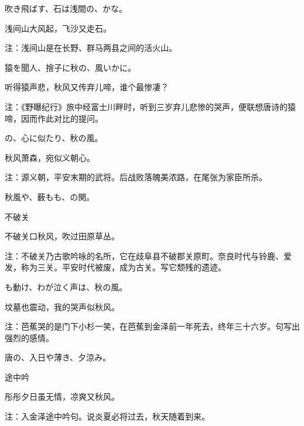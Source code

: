 \begin{haiku}
    {\FH 吹き飛ばす、石は浅間の、かな。}

    {\FK 浅间山大风起，飞沙又走石。}

    {\FT 注：浅间山是在长野、群马两县之间的活火山。}
\end{haiku}

\begin{haiku}
    {\FH 猿を聞人、捨子に秋の、風いかに。}

    {\FK 听得猿声悲，秋风又传弃儿啼，谁个最惨凄？}

    {\FT 注：《野曝纪行》旅中经富士川畔时，听到三岁弃儿悲惨的哭声，便联想唐诗的猿啼，因而作此对比的提问。}
\end{haiku}

\begin{haiku}
    {\FH {}の、心に似たり、秋の風。}

    {\FK 秋风萧森，宛似义朝心。}

    {\FT 注：源义朝，平安末期的武将。后战败落魄美浓路，在尾张为家臣所杀。}
\end{haiku}

\begin{haiku}
    {\FH 秋風や、薮もも、の関。}

    {\FK 不破关}

    {\FK 不破关口秋风，吹过田原草丛。}

    {\FT 注：不破关乃古歌吟咏的名所，它在歧阜县不破郡关原町。奈良时代与铃鹿、爱发，称为三关。平安时代被废，成为古关。写它颓残的遗迹。}
\end{haiku}

\begin{haiku}
    {\FH {}も動け、わが泣く声は、秋の風。}

    {\FK 坟墓也震动，我的哭声似秋风。}

    {\FT 注：芭蕉哭的是门下小杉一笑，在芭蕉到金泽前一年死去，终年三十六岁。句写出强烈的感情。}
\end{haiku}

\begin{haiku}
    {\FH 唐の、入日や薄き、夕涼み。}

    {\FK 途中吟}

    {\FK 彤彤夕日虽无情，凉爽又秋风。}

    {\FT 注：入金泽途中吟句。说炎夏必将过去，秋天随着到来。}
\end{haiku}

